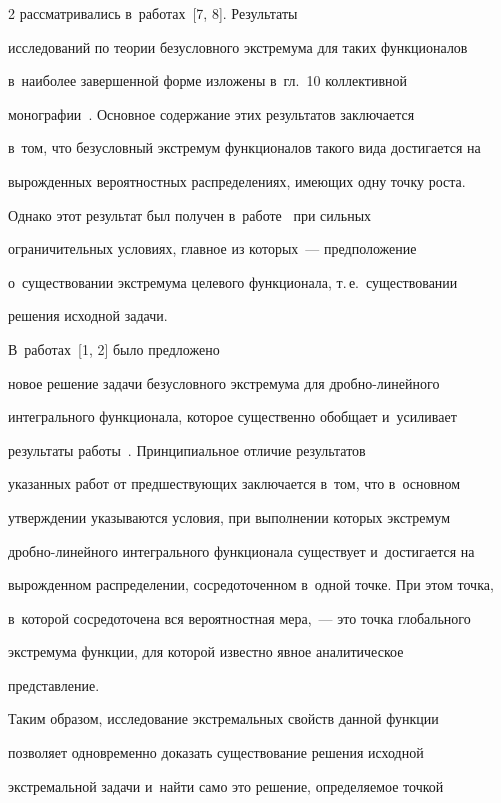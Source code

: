 \begin{multicols}{2}
рассматривались в~работах~[7, 8]. Результаты  

исследований по тео\-рии безуслов\-но\-го экстремума для таких функционалов 

в~наиболее завершенной форме изложены в~гл.~10 коллективной 

монографии~\cite{8-shn}. Основное содержание этих результатов заключается 

в~том, что безусловный экстремум функционалов такого вида достигается на 

вырожденных вероятностных распределениях, име\-ющих одну точ\-ку рос\-та. 

Однако этот результат был получен в~работе~\cite{8-shn} при сильных 

ограничительных условиях, главное из которых~--- предположение 

о~существовании экстремума целевого функционала, т.\,е.\ существовании 

решения исходной задачи. 



В~работах~[1, 2] было предложено 

новое решение задачи без\-услов\-но\-го экстремума для дроб\-но-ли\-ней\-но\-го 

интегрального функционала, которое существенно обобщает и~усиливает 

результаты работы~\cite{8-shn}. Принципиальное отличие результатов 

указанных работ от пред\-ше\-ст\-ву\-ющих за\-клю\-ча\-ет\-ся в~том, что в~основном 

утверж\-де\-нии указываются условия, при выполнении которых экстремум 

дроб\-но-ли\-ней\-но\-го интегрального функционала существует и~достигается на 

вы\-рож\-ден\-ном распределении, сосредоточенном в~одной точке. При этом точка, 

в~которой сосредоточена вся вероятностная мера,~--- это точка глобального 

экстремума функ\-ции, для которой известно явное аналитическое 

представление. 

     

     Таким образом, исследование экстремальных свойств данной функции 

позволяет одновременно доказать существование решения исходной 

экстремальной задачи и~найти само это решение, опре\-де\-ля\-емое точ\-кой 


\end{multicols}
